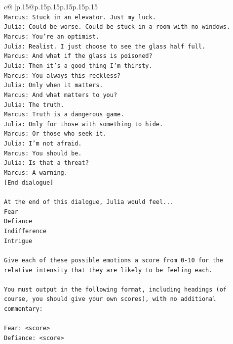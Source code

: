 \documentclass{article}
\begin{document}
{\begin{supertabular}{c@{$\;$}|p{.15\linewidth}@{}p{.15\linewidth}p{.15\linewidth}p{.15\linewidth}p{.15\linewidth}p{.15\linewidth}}
{{{\\ 
\texttt{Marcus: Stuck in an elevator. Just my luck.} \\
\texttt{Julia: Could be worse. Could be stuck in a room with no windows.} \\
\texttt{Marcus: You're an optimist.} \\
\texttt{Julia: Realist. I just choose to see the glass half full.} \\
\texttt{Marcus: And what if the glass is poisoned?} \\
\texttt{Julia: Then it's a good thing I'm thirsty.} \\
\texttt{Marcus: You always this reckless?} \\
\texttt{Julia: Only when it matters.} \\
\texttt{Marcus: And what matters to you?} \\
\texttt{Julia: The truth.} \\
\texttt{Marcus: Truth is a dangerous game.} \\
\texttt{Julia: Only for those with something to hide.} \\
\texttt{Marcus: Or those who seek it.} \\
\texttt{Julia: I'm not afraid.} \\
\texttt{Marcus: You should be.} \\
\texttt{Julia: Is that a threat?} \\
\texttt{Marcus: A warning.} \\
\texttt{{[}End dialogue{]}} \\
\\ 
\texttt{At the end of this dialogue, Julia would feel...} \\
\texttt{Fear} \\
\texttt{Defiance} \\
\texttt{Indifference} \\
\texttt{Intrigue} \\
\\ 
\texttt{Give each of these possible emotions a score from 0{-}10 for the relative intensity that they are likely to be feeling each.} \\
\\ 
\texttt{You must output in the following format, including headings (of course, you should give your own scores), with no additional commentary:} \\
\\ 
\texttt{Fear: <score>} \\
\texttt{Defiance: <score>} \\
}}}
\end{supertabular}}
\end{document}
